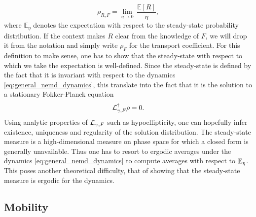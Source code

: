 \begin{equation}
    \label{eq:transport_coefficient}
    \rho_{R,F}=\underset{\eta \to 0}{\lim}\, \frac{\mathbb{E}[R]}{\eta},
\end{equation}
where $\mathbb{E}_\eta$ denotes the expectation with respect to the steady-state probability distribution. 
If the context makes $R$ clear from the knowledge of $F$, we will drop it from the notation and simply write $\rho_F$ for the transport coefficient.
For this definition to make sense, one has to show that the steady-state with respect to which we take the expectation is well-defined.
Since the steady-state is defined by the fact that it is invariant with respect to the dynamics \eqref{eq:general_nemd_dynamics}, 
this translate into the fact that it is the solution to a stationary Fokker-Planck equation
\begin{equation}
    \label{eq:nemd_fp_equation}
    \mathcal{L}_{\gamma,F}^\dagger \rho = 0.
\end{equation}
Using analytic properties of $\mathcal{L}_{\gamma,F}$ such as hypoellipticity, one can hopefully infer existence, uniqueness and regularity of the solution distribution.
The steady-state measure is a high-dimensional measure on phase space for which a closed form is generally unavailable.
 Thus one has to resort to ergodic averages under the dynamics \eqref{eq:general_nemd_dynamics} to compute averages with respect to $\mathbb{E}_\eta$.
 This poses another theoretical difficulty, that of showing that the steady-state measure is ergodic for the dynamics.

 \begin{remark}
 \end{remark}

\subsection{Mobility}
